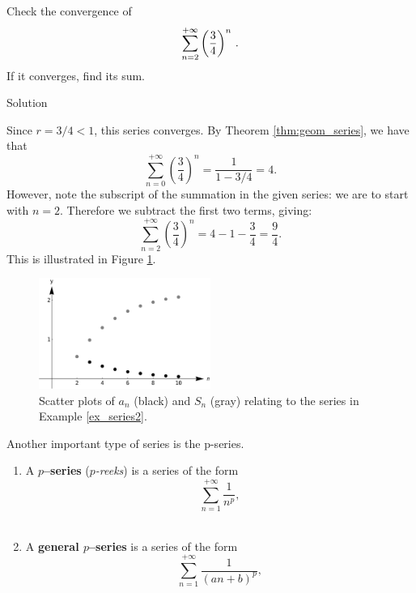 \begin{example}\label{ex_series2}
Check the convergence of 
$$\displaystyle \sum_{n=2}^{+\infty} \left(\frac34\right)^n\,.$$
 If it converges, find its sum.


Solution 


Since $r=3/4<1$, this series converges. By Theorem \ref{thm:geom_series}, we have that
$$\sum_{n=0}^{+\infty} \left(\frac34\right)^n = \frac{1}{1-3/4} = 4.$$ However, note the subscript of the summation in the given series: we are to start with $n=2$. Therefore we subtract the first two terms, giving:
$$\sum_{n=2}^{+\infty} \left(\frac34\right)^n = 4 - 1 - \frac34 = \frac94.$$
This is illustrated in Figure \ref{fig_series_6}.


\begin{figure}[H]
	\begin{center}
			\includegraphics[width=0.5\textwidth]{fig_series_6}
	\caption{Scatter plots of $a_n$ (black) and $S_n$ (gray) relating to the series in Example \ref{ex_series2}.}
	\label{fig_series_6}
	\end{center}
\end{figure}
\end{example}

Another important type of series is the p-series.

\begin{definition}[$p$-series]\label{def:pseries}
\begin{enumerate}
\item	A \textbf{$p$--series} (\textit{$p$-reeks}) is a series of the form $$\sum_{n=1}^{+\infty} \frac{1}{n^p},$$\\
\qquad {}

\item	A \textbf{general $p$--series} is a series of the form 
$$\sum_{n=1}^{+\infty} \frac{1}{(an+b)^p},$$\\
\qquad {}
\end{enumerate}
\end{definition}

